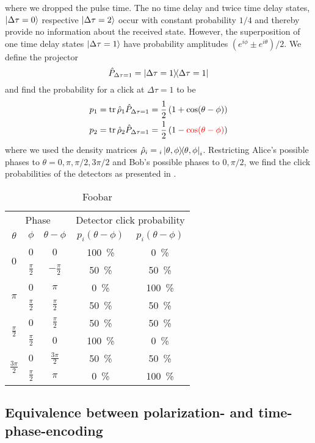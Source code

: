 where we dropped the pulse time.
The no time delay and twice time delay states, $\ket{\Delta\tau=0}$ respective $\ket{\Delta\tau=2}$ occur with constant probability $1/4$ and thereby provide no information about the received state.
However, the superposition of one time delay states $\ket{\Delta\tau=1}$ have probability amplitudes $(e^{i\phi}\pm e^{i\theta})/2$.
We define the projector
\begin{equation}
	\hat{P}_{\Delta\tau=1}
	=
	\ketbra{\Delta\tau=1}
\end{equation}
and find the probability for a click at $\Delta\tau=1$ to be
\begin{align}
	p_1
	&=
	\trace{\hat\rho_1\hat{P}_{\Delta\tau=1}}
	=
	\frac{1}{2}
	\left(1+\cos(\theta-\phi)\right)
	\\
	p_2
	&=
	\trace{\hat\rho_2\hat{P}_{\Delta\tau=1}}
	=
	\frac{1}{2}
	\left(1-\textcolor{red}{\cos(\theta-\phi)}\right)
\end{align}
where we used the density matrices $\hat\rho_i={}_i\ketbra{\theta,\phi}_i$.
Restricting Alice's possible phases to $\theta=0,\pi,\pi/2,3\pi/2$ and Bob's possible phases to $0,\pi/2$, we find the click probabilities of the detectors as presented in .
\begin{table}[htb]
	\centering
	\begin{tabular}{ccccc}
		\toprule
		\multicolumn{3}{c}{Phase} & \multicolumn{2}{c}{Detector click probability} \\
		\cmidrule{1-3}
		\cmidrule{4-5}
		$\theta$ & $\phi$ & $\theta-\phi$ & $p_i(\theta-\phi)$ & $p_i(\theta-\phi)$ \\
		\midrule
		\multirow{2}{*}{$0$} & $0$ & $0$ & \SI{100}{\percent} & \SI{0}{\percent} \\
		& $\frac{\pi}{2}$ & $-\frac{\pi}{2}$ & \SI{50}{\percent} & \SI{50}{\percent} \\
		\cmidrule{1-3}
		\multirow{2}{*}{$\pi$} & $0$ & $\pi$ & \SI{0}{\percent} & \SI{100}{\percent} \\
		& $\frac{\pi}{2}$ & $\frac{\pi}{2}$ & \SI{50}{\percent} & \SI{50}{\percent} \\
		\cmidrule{1-3}
		\multirow{2}{*}{$\frac{\pi}{2}$} & $0$ & $\frac{\pi}{2}$ & \SI{50}{\percent} & \SI{50}{\percent} \\
		& $\frac{\pi}{2}$ & $0$ & \SI{100}{\percent} & \SI{0}{\percent} \\
		\cmidrule{1-3}
		\multirow{2}{*}{$\frac{3\pi}{2}$} & $0$ & $\frac{3\pi}{2}$ & \SI{50}{\percent} & \SI{50}{\percent} \\
		& $\frac{\pi}{2}$ & $\pi$ & \SI{0}{\percent} & \SI{100}{\percent} \\
		\bottomrule
	\end{tabular}
	\caption{Foobar}\label{tab:tp_bb84_probabilities}
\end{table}

\subsection{Equivalence between polarization- and time-phase-encoding}